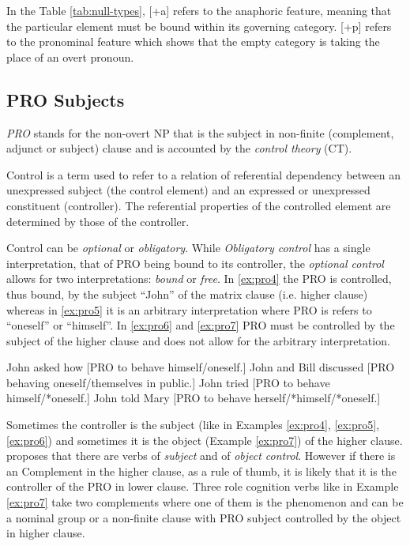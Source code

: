 In the Table \ref{tab:null-types}, [+a] refers to the anaphoric feature, meaning that the particular element must be bound within its governing category. [+p] refers to the pronominal feature which shows that the empty category is taking the place of an overt pronoun.

\subsection{PRO Subjects}
\label{sec:pro-mcg}
\textit{PRO} stands for the non-overt NP that is the subject in non-finite (complement, adjunct or subject) clause and is accounted by the \textit{control theory} (CT).

\begin{definition}[Control]\label{def:control}
	Control is a term used to refer to a relation of referential dependency between an unexpressed subject (the control element) and an expressed or unexpressed constituent (controller). The referential properties of the controlled element are determined by those of the controller.\citep{Brensan1982}
\end{definition}

Control can be \textit{optional} or \textit{obligatory}. While \textit{Obligatory control} has a single interpretation, that of PRO being bound to its controller, the \textit{optional control} allows for two interpretations: \textit{bound} or \textit{free}. In \ref{ex:pro4} the PRO is controlled, thus bound, by the subject ``John'' of the matrix clause (i.e. higher clause) whereas in \ref{ex:pro5} it is an arbitrary interpretation where PRO is refers to ``oneself'' or ``himself''. In \ref{ex:pro6} and \ref{ex:pro7} PRO must be controlled by the subject of the higher clause and does not allow for the arbitrary interpretation.

\begin{exe}
	\ex\label{ex:pro4}John asked how [PRO to behave himself/oneself.]
	\ex\label{ex:pro5}John and Bill discussed [PRO behaving oneself/themselves in public.]
	\ex\label{ex:pro6}John tried [PRO to behave himself/*oneself.]
	\ex\label{ex:pro7}John told Mary [PRO to behave herself/*himself/*oneself.]
\end{exe}

Sometimes the controller is the subject (like in Examples \ref{ex:pro4}, \ref{ex:pro5}, \ref{ex:pro6}) and sometimes it is the object (Example \ref{ex:pro7}) of the higher clause. \citet[p.~278]{Haegeman1991} proposes that there are verbs of \textit{subject} and of \textit{object control}. 
However if there is an Complement in the higher clause, as a rule of thumb, it is likely that it is the controller of the PRO in lower clause. Three role cognition verbs like in Example \ref{ex:pro7} take two complements where one of them is the phenomenon and can be a nominal group or a non-finite clause with PRO subject controlled by the object in higher clause.

